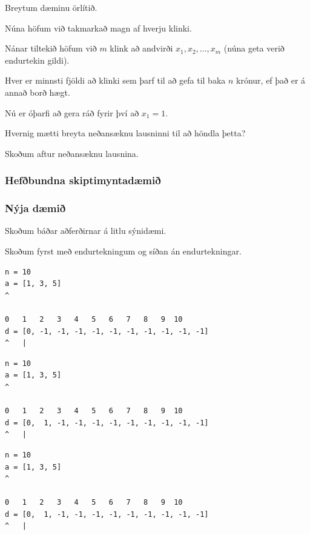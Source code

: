 {
    {
        \item<1-> Breytum dæminu örlítið.
            \item<2-> Núna höfum við takmarkað magn af hverju klinki.
            \item<3-> Nánar tiltekið höfum við $m$ klink að andvirði $x_1, x_2, ..., x_m$ (núna geta verið endurtekin gildi).
            \item<4-> Hver er minnsti fjöldi að klinki sem þarf til að gefa til baka $n$ krónur, ef það er á annað borð hægt.
            \item<5-> Nú er óþarfi að gera ráð fyrir því að $x_1 = 1$.
            \item<6-> Hvernig mætti breyta neðansæknu lausninni til að höndla þetta?
            \item<7-> Skoðum aftur neðansæknu lausnina.
    }
}

{
    \frametitle{Hefðbundna skiptimyntadæmið}
}

{
    \frametitle{Nýja dæmið}
}

{
    {
        \item<1-> Skoðum báðar aðferðirnar á litlu sýnidæmi.
            \item<2-> Skoðum fyrst með endurtekningum og síðan án endurtekningar.
    }
}

\begin{frame}[fragile]
\begin{verbatim}
n = 10
a = [1, 3, 5]
^

0   1   2   3   4   5   6   7   8   9  10
d = [0, -1, -1, -1, -1, -1, -1, -1, -1, -1, -1]
^   |
\end{verbatim}
\end{frame}
\addtocounter{framenumber}{-1}

\begin{frame}[fragile]
\begin{verbatim}
n = 10
a = [1, 3, 5]
^

0   1   2   3   4   5   6   7   8   9  10
d = [0,  1, -1, -1, -1, -1, -1, -1, -1, -1, -1]
^   |
\end{verbatim}
\end{frame}
\addtocounter{framenumber}{-1}

\begin{frame}[fragile]
\begin{verbatim}
n = 10
a = [1, 3, 5]
^

0   1   2   3   4   5   6   7   8   9  10
d = [0,  1, -1, -1, -1, -1, -1, -1, -1, -1, -1]
^   |
\end{verbatim}
\end{frame}
\addtocounter{framenumber}{-1}

